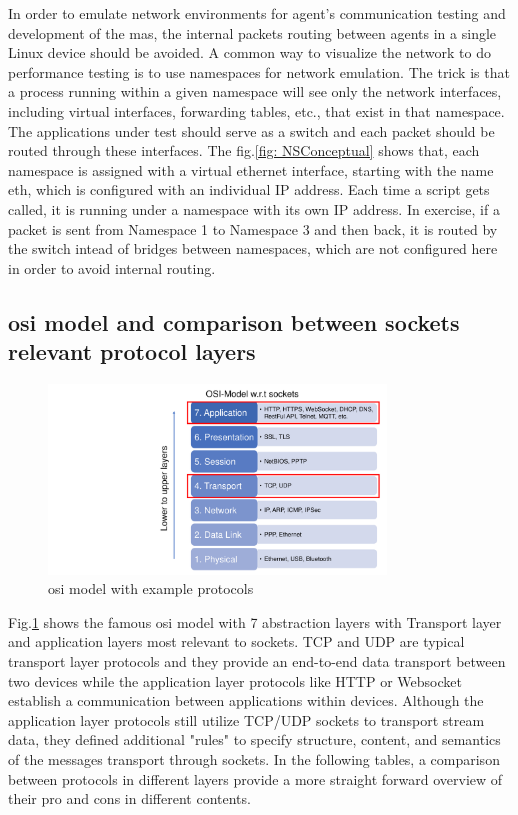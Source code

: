 In order to emulate network environments for agent's communication testing and development of the \gls{mas}, the internal packets routing between agents in a single Linux device should be avoided. A common way to visualize the network to do performance testing is to use namespaces for network emulation. The trick is that a process running within a given namespace will see only the network interfaces, including virtual interfaces, forwarding tables, etc., that exist in that namespace. The applications under test should serve as a switch and each packet should be routed through these interfaces. The fig.\ref{fig: NSConceptual} shows that, each namespace is assigned with a virtual ethernet interface, starting with the name eth, which is configured with an individual IP address. Each time a script gets called, it is running under a namespace with its own IP address. In exercise, if a packet is sent from Namespace 1 to Namespace 3 and then back, it is routed by the switch intead of bridges between namespaces, which are not configured here in order to avoid internal routing.

\subsection{\gls{osi} model and comparison between sockets relevant protocol layers}
\begin{figure}[htbp]
\includegraphics[width=0.8\textwidth]{figures/OSI.pdf}
\centering
\caption{\gls{osi} model with example protocols \label{fig: OSI}}
\end{figure}

Fig.\ref{fig: OSI} shows the famous \gls{osi} model with 7 abstraction layers with Transport layer and application layers most relevant to sockets. 
TCP and UDP are typical transport layer protocols and they provide an end-to-end data transport between two devices while the application layer protocols like HTTP or Websocket establish a communication between applications within devices. 
Although the application layer protocols still utilize TCP/UDP sockets to transport stream data, they defined additional "rules" to specify structure, content, and semantics of the messages transport through sockets. 
In the following tables, a comparison between protocols in different layers provide a more straight forward overview of their pro and cons in different contents.


